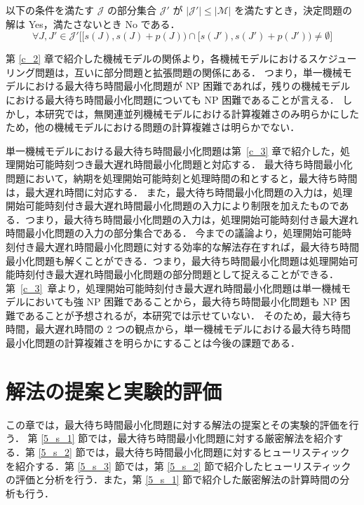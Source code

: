 \documentclass[12pt]{optlab-bachelor}
\begin{document}
以下の条件を満たす $\mathcal{J}$ の部分集合 $\mathcal{J}'$ が $|\mathcal{J}'| \le |\mathcal{M}|$ を満たすとき，決定問題の解は Yes，満たさないとき No である．
\begin{displaymath}
  \forall J,J' \in \mathcal{J}'\bigg[\big[s(J),s(J) + p(J)\big) \cap \big[s(J'),s(J') + p(J')\big) \neq \emptyset\bigg]
\end{displaymath}

第 \ref{c_2} 章で紹介した機械モデルの関係より，各機械モデルにおけるスケジューリング問題は，互いに部分問題と拡張問題の関係にある．
つまり，単一機械モデルにおける最大待ち時間最小化問題が NP 困難であれば，残りの機械モデルにおける最大待ち時間最小化問題についても NP 困難であることが言える．
しかし，本研究では，無関連並列機械モデルにおける計算複雑さのみ明らかにしたため，他の機械モデルにおける問題の計算複雑さは明らかでない．

単一機械モデルにおける最大待ち時間最小化問題は第~\ref{c_3} 章で紹介した，処理開始可能時刻つき最大遅れ時間最小化問題と対応する．
最大待ち時間最小化問題において，納期を処理開始可能時刻と処理時間の和とすると，最大待ち時間は，最大遅れ時間に対応する．
また，最大待ち時間最小化問題の入力は，処理開始可能時刻付き最大遅れ時間最小化問題の入力により制限を加えたものである．つまり，最大待ち時間最小化問題の入力は，処理開始可能時刻付き最大遅れ時間最小化問題の入力の部分集合である．
今までの議論より，処理開始可能時刻付き最大遅れ時間最小化問題に対する効率的な解法存在すれば，最大待ち時間最小化問題も解くことができる．つまり，最大待ち時間最小化問題は処理開始可能時刻付き最大遅れ時間最小化問題の部分問題として捉えることができる．
第~\ref{c_3}~章より，処理開始可能時刻付き最大遅れ時間最小化問題は単一機械モデルにおいても強 NP 困難であることから，最大待ち時間最小化問題も NP 困難であることが予想されるが，本研究では示せていない．
そのため，最大待ち時間，最大遅れ時間の 2 つの観点から，単一機械モデルにおける最大待ち時間最小化問題の計算複雑さを明らかにすることは今後の課題である．


\chapter{解法の提案と実験的評価}\label{c_5}
この章では，最大待ち時間最小化問題に対する解法の提案とその実験的評価を行う．
第 \ref{5_s_1} 節では，最大待ち時間最小化問題に対する厳密解法を紹介する．第 \ref{5_s_2} 節では，最大待ち時間最小化問題に対するヒューリスティックを紹介する．第 \ref{5_s_3} 節では，第 \ref{5_s_2} 節で紹介したヒューリスティックの評価と分析を行う．また，第 \ref{5_s_1} 節で紹介した厳密解法の計算時間の分析も行う．
\end{document}
